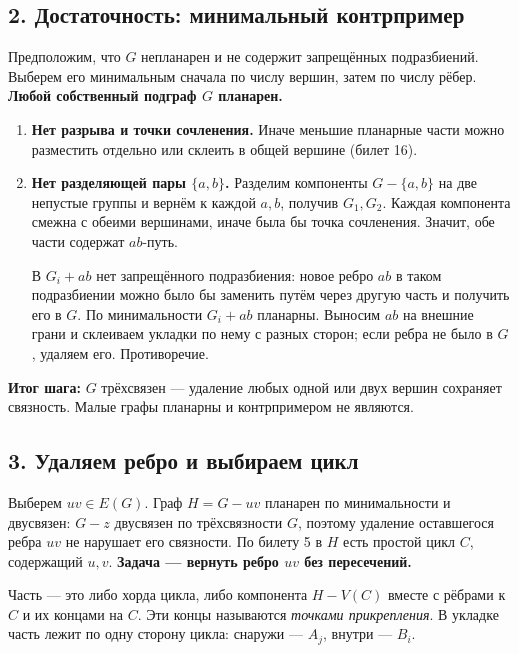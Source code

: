 \subsection*{2. Достаточность: минимальный контрпример}
\hypertarget{pk:step2}{}
Предположим, что \(G\) непланарен и не содержит запрещённых подразбиений.
Выберем его минимальным сначала по числу вершин, затем по числу рёбер.
\textbf{Любой собственный подграф \(G\) планарен.}

\begin{enumerate}[leftmargin=*,itemsep=4pt,topsep=3pt]
\item \textbf{Нет разрыва и точки сочленения.}
Иначе меньшие планарные части можно разместить отдельно или склеить
в общей вершине (билет 16).
\item \textbf{Нет разделяющей пары \(\{a,b\}\).}
Разделим компоненты \(G-\{a,b\}\) на две непустые группы и вернём
к каждой \(a,b\), получив \(G_1,G_2\). Каждая компонента смежна с обеими
вершинами, иначе была бы точка сочленения. Значит, обе части содержат
\(ab\)-путь.

В \(G_i+ab\) нет запрещённого подразбиения: новое ребро \(ab\) в таком
подразбиении можно было бы заменить путём через другую часть и получить
его в \(G\). По минимальности \(G_i+ab\) планарны. Выносим \(ab\)
на внешние грани и склеиваем укладки по нему с разных сторон;
если ребра не было в \(G\), удаляем его. Противоречие.
\end{enumerate}
\begin{tcolorbox}[colback=cbBlueBack,colframe=cbBlue]
\textbf{Итог шага:} \(G\) трёхсвязен — удаление любых одной или двух
вершин сохраняет связность. Малые графы планарны и контрпримером не являются.
\end{tcolorbox}

\newpage
\subsection*{3. Удаляем ребро и выбираем цикл}
\hypertarget{pk:step3}{}
Выберем \(uv\in E(G)\). Граф \(H=G-uv\) планарен по минимальности
и двусвязен: \(G-z\) двусвязен по трёхсвязности \(G\), поэтому удаление
оставшегося ребра \(uv\) не нарушает его связности.
По билету 5 в \(H\) есть простой цикл \(C\), содержащий \(u,v\).
\textbf{Задача — вернуть ребро \(uv\) без пересечений.}

\begin{definition}
Часть — это либо хорда цикла, либо компонента \(H-V(C)\) вместе
с рёбрами к \(C\) и их концами на \(C\).
Эти концы называются \emph{точками прикрепления}.
В укладке часть лежит по одну сторону цикла:
снаружи — \(A_j\), внутри — \(B_i\).
\end{definition}


